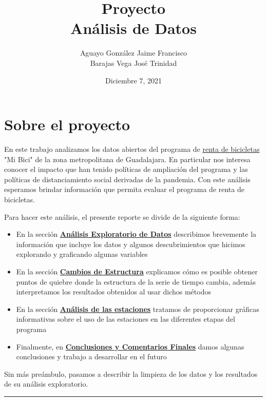 \documentclass[
]{article}
\title{Proyecto \\ Análisis de Datos}
\author{Aguayo González Jaime Francisco\\ Barajas Vega José Trinidad}
\date{ Diciembre 7, 2021}
\begin{document}
\maketitle
\newpage
\hypertarget{proyecto-de-anuxe1lisis-de-datos}{%
\section{Sobre el proyecto}\label{proyecto-de-anuxe1lisis-de-datos}}

En este trabajo analizamos los datos abiertos del programa de
\href{https://mibici.net}{renta de bicicletas} "Mi Bici" de la zona
metropolitana de Guadalajara. En particular nos interesa conocer el
impacto que han tenido políticas de ampliación del programa y las
políticas de distanciamiento social derivadas de la pandemia. Con este
análisis esperamos brindar información que permita evaluar el programa
de renta de bicicletas.

Para hacer este análisis, el presente reporte se divide de la siguiente
forma:

\begin{itemize}
\item
  En la sección
  \protect\hyperlink{anuxe1lisis-exploratorio-de-datos}{\textbf{Análisis
  Exploratorio de Datos}} describimos brevemente la información que
  incluye los datos y algunos descubrimientos que hicimos explorando y
  graficando algunas variables
\item
  En la sección \protect\hyperlink{cambios-de-estructura}{\textbf{Cambios de
  Estructura}} explicamos cómo es posible obtener puntos de quiebre donde
  la estructura de la serie de tiempo cambia, además interpretamos los
  resultados obtenidos al usar dichos métodos
\item
  En la sección
  \protect\hyperlink{anuxe1lisis-de-las-estaciones}{\textbf{Análisis de las
  estaciones}} tratamos de proporcionar gráficas informativas sobre el
  uso de las estaciones en las diferentes etapas del programa
\item
  Finalmente, en
  \protect\hyperlink{conclusiones-y-comentarios-finales}{\textbf{Conclusiones y
  Comentarios Finales}} damos algunas conclusiones y trabajo a
  desarrollar en el futuro
\end{itemize}

Sin más preámbulo, pasamos a describir la limpieza de los datos y los
resultados de su análisis exploratorio.
\newpage
\begin{center}\rule{0.5\linewidth}{0.5pt}\end{center}
\end{document}
